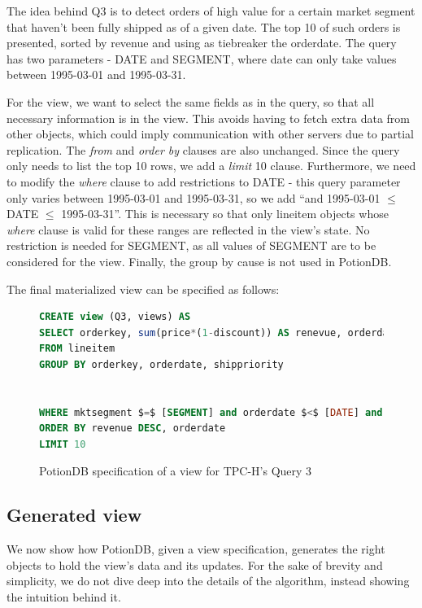 \documentclass[sigconf, nonacm]{acmart}
\begin{document}
The idea behind Q3 is to detect orders of high value for a certain market segment that haven't been fully shipped as of a given date.
The top 10 of such orders is presented, sorted by revenue and using as tiebreaker the orderdate.
The query has two parameters - DATE and SEGMENT, where date can only take values between 1995-03-01 and 1995-03-31.

For the view, we want to select the same fields as in the query, so that all necessary information is in the view.
This avoids having to fetch extra data from other objects, which could imply communication with other servers due to partial replication.
The \emph{from} and \emph{order by} clauses are also unchanged. %
Since the query only needs to list the top 10 rows, we add a \emph{limit} 10 clause.
Furthermore, we need to modify the \emph{where} clause to add restrictions to DATE - this query parameter only varies between 1995-03-01 and 1995-03-31, so we add ``and 1995-03-01 $\leq$ DATE $\leq$ 1995-03-31''.
This is necessary so that only lineitem objects whose \emph{where} clause is valid for these ranges are reflected in the view's state.
No restriction is needed for SEGMENT, as all values of SEGMENT are to be considered for the view.
Finally, the group by cause is not used in PotionDB.

The final materialized view can be specified as follows:

\begin{figure}[h]
	\begin{lstlisting}[language=SQL]
CREATE view (Q3, views) AS
SELECT orderkey, sum(price*(1-discount)) AS renevue, orderdate, shippriority
FROM lineitem
GROUP BY orderkey, orderdate, shippriority


WHERE mktsegment $=$ [SEGMENT] and orderdate $<$ [DATE] and shipdate $>$ [DATE] and 1995-03-01 $\leq$ DATE $\leq$ 1995-03-31
ORDER BY revenue DESC, orderdate
LIMIT 10
	\end{lstlisting}
\caption{PotionDB specification of a view for TPC-H's Query 3}
\label{fig:q3_view}
\end{figure}

\subsection{Generated view}
\label{subsec:generated_view}

We now show how PotionDB, given a view specification, generates the right objects to hold the view's data and its updates.
For the sake of brevity and simplicity, we do not dive deep into the details of the algorithm, instead showing the intuition behind it.
\end{document}

